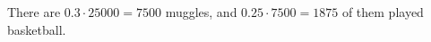 There are $0.3\cdot25000=7500$ muggles, and $0.25\cdot7500=\boxed{1875}$ of them played basketball.
